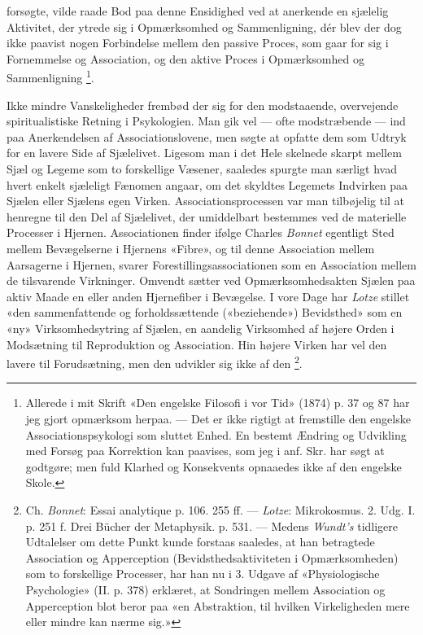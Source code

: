 \documentclass[12pt,a4paper,openany]{book}
\begin{document}
forsøgte, vilde raade Bod paa denne Ensidighed ved at anerkende en sjælelig
Aktivitet, der ytrede sig i Opmærksomhed og Sammenligning, dér blev der dog
ikke paavist nogen Forbindelse mellem den passive Proces, som gaar for sig i
Fornemmelse og Association, og den aktive Proces i Opmærksomhed og Sammenligning%
\footnote[1]{Allerede i mit Skrift «Den engelske Filosofi i vor Tid» (1874) p.
37 og 87 har jeg gjort opmærksom herpaa. --- Det er ikke rigtigt at fremstille
den engelske Associationspsykologi som sluttet Enhed. En bestemt Ændring og
Udvikling med Forsøg paa Korrektion kan paavises, som jeg i anf. Skr. har søgt
at godtgøre; men fuld Klarhed og Konsekvents opnaaedes ikke af den engelske Skole.}.

Ikke mindre Vanskeligheder frembød der sig for den modstaaende, overvejende
spiritualistiske Retning i Psykologien. Man gik vel --- ofte modstræbende ---
ind paa Anerkendelsen af Associationslovene, men søgte at opfatte dem som
Udtryk for en lavere Side af Sjælelivet. Ligesom man i det Hele skelnede skarpt
mellem Sjæl og Legeme som to forskellige Væsener, saaledes spurgte man særligt
hvad hvert enkelt sjæleligt Fænomen angaar, om det skyldtes Legemets Indvirken
paa Sjælen eller Sjælens egen Virken. Associationsprocessen var man tilbøjelig
til at henregne til den Del af Sjælelivet, der umiddelbart bestemmes ved de
materielle Processer i Hjernen. Associationen finder ifølge Charles
\emph{Bonnet} egentligt Sted mellem Bevægelserne i Hjernens «Fibre», og til
denne Association mellem Aarsagerne i Hjernen, svarer
Forestillingsassociationen som en Association mellem de tilsvarende Virkninger.
Omvendt sætter ved Opmærksomhedsakten Sjælen paa aktiv Maade en eller anden
Hjernefiber i Bevægelse. I vore Dage har \emph{Lotze} stillet «den
sammenfattende og forholdssættende («beziehende») Bevidsthed» som en «ny»
Virksomhedsytring af Sjælen, en aandelig Virksomhed af højere Orden i
Modsætning til Reproduktion og Association. Hin højere Virken har vel den
lavere til Forudsætning, men den udvikler sig ikke af den%
\footnote[2]{Ch. \emph{Bonnet}: Essai analytique p. 106. 255 ff. ---
\emph{Lotze}: Mikrokosmus. 2. Udg. I. p. 251 f. Drei Bücher der Metaphysik. p.
531. --- Medens \emph{Wundt's} tidligere Udtalelser om dette Punkt kunde
forstaas saaledes, at han betragtede Association og Apperception
(Bevidsthedsaktiviteten i Opmærksomheden) som to forskellige Processer, har han
nu i 3. Udgave af «Physiologische Psychologie» (II. p. 378) erklæret, at
Sondringen mellem Association og Apperception blot beror paa «en Abstraktion,
til hvilken Virkeligheden mere eller mindre kan nærme sig.»}.
\end{document}
